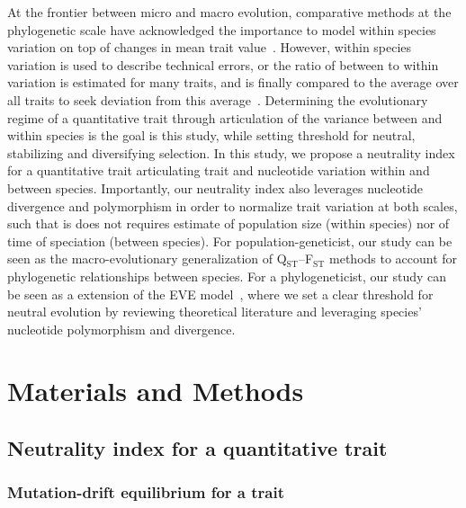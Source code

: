 \documentclass{article}
\begin{document}
At the frontier between micro and macro evolution, comparative methods at the phylogenetic scale have acknowledged the importance to model within species variation on top of changes in mean trait value~\cite{fay_evaluating_2008, kostikova_bridging_2016, gaboriau_multiplatform_2020}.
However, within species variation is used to describe technical errors, or the ratio of between to within variation is estimated for many traits, and is finally compared to the average over all traits to seek deviation from this average~\cite{rohlfs_modeling_2014, rohlfs_phylogenetic_2015}.
Determining the evolutionary regime of a quantitative trait through articulation of the variance between and within species is the goal is this study, while setting threshold for neutral, stabilizing and diversifying selection.
In this study, we propose a neutrality index for a quantitative trait articulating trait and nucleotide variation within and between species.
Importantly, our neutrality index also leverages nucleotide divergence and polymorphism in order to normalize trait variation at both scales, such that is does not requires estimate of population size (within species) nor of time of speciation (between species).
For population-geneticist, our study can be seen as the macro-evolutionary generalization of Q$_\text{ST}$--F$_\text{ST}$ methods to account for phylogenetic relationships between species.
For a phylogeneticist, our study can be seen as a extension of the EVE model~\cite{rohlfs_modeling_2014, rohlfs_phylogenetic_2015}, where we set a clear threshold for neutral evolution by reviewing theoretical literature and leveraging species' nucleotide polymorphism and divergence.

\section*{Materials and Methods}\label{sec:materials-and-methods}
\subsection*{Neutrality index for a quantitative trait}\label{subsec:neutrality-index-for-a-quantitative-trait}
\subsubsection*{Mutation-drift equilibrium for a trait}
\end{document}
